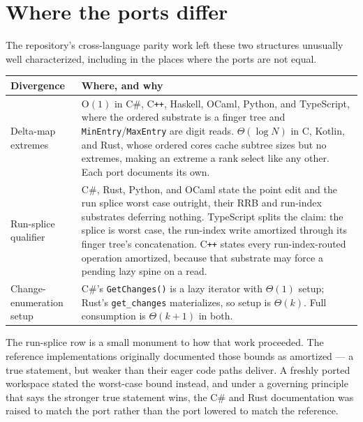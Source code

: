 \documentclass[11pt,twoside,openright]{book}
\makeatletter
\newcommand{\code}[1]{\texorpdfstring{\textcolor{d7ink}{\texttt{#1}}}{#1}}
\newcommand{\bigoh}[1]{$\mathrm{O}(#1)$}
\newenvironment{d7table}[1]
  {\par\vspace{3pt}\small
   \setlength{\LTpre}{4pt}\setlength{\LTpost}{4pt}
   \begin{longtable}{@{}%
     >{\raggedright\arraybackslash}p{#1\textwidth}%
     @{\hspace{10pt}}%
     >{\raggedright\arraybackslash}p{\dimexpr\textwidth-#1\textwidth-10pt\relax}@{}}}
  {\end{longtable}}
\newcommand{\thead}[1]{\sffamily\bfseries\footnotesize\color{d7ink}#1}
\makeatother
\begin{document}
\section{Where the ports differ}

The repository's cross-language parity work left these two structures unusually
well characterized, including in the places where the ports are not equal.

\begin{d7table}{0.30}
\toprule
\thead{Divergence} & \thead{Where, and why} \\
\midrule
Delta-map extremes &
\bigoh{1} in C\#, C\texttt{++}, Haskell, OCaml, Python, and TypeScript, where the
ordered substrate is a finger tree and \code{MinEntry}/\code{MaxEntry} are digit
reads. $\Theta(\log N)$ in C, Kotlin, and Rust, whose ordered cores cache
subtree sizes but no extremes, making an extreme a rank select like any other.
Each port documents its own. \\
Run-splice qualifier &
C\#, Rust, Python, and OCaml state the point edit and the run splice worst case
outright, their RRB and run-index substrates deferring nothing. TypeScript
splits the claim: the splice is worst case, the run-index write amortized
through its finger tree's concatenation. C\texttt{++} states every
run-index-routed operation amortized, because that substrate may force a pending
lazy spine on a read. \\
Change-enumeration setup &
C\#'s \code{GetChanges()} is a lazy iterator with $\Theta(1)$ setup; Rust's
\code{get\_changes} materializes, so setup is $\Theta(k)$. Full consumption is
$\Theta(k + 1)$ in both. \\
\bottomrule
\end{d7table}

\noindent
The run-splice row is a small monument to how that work proceeded. The reference
implementations originally documented those bounds as amortized --- a true
statement, but weaker than their eager code paths deliver. A freshly ported
workspace stated the worst-case bound instead, and under a governing principle
that says the stronger true statement wins, the C\# and Rust documentation was
raised to match the port rather than the port lowered to match the
reference.


\end{document}
